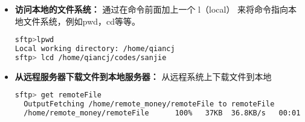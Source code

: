 \documentclass[lang=cn,a4paper,newtx]{elegantpaper}
\begin{document}
\begin{itemize}
  首先，通过找出我们当前在远程系统上的哪个目录来定位自己
  \begin{lstlisting}[language=bash]
sftp>pwd
Remote working directory: /home/sesame
  \end{lstlisting}
  查看远程系统当前目录的内容
  \begin{lstlisting}[language=bash]
sftp>ls
Cognata                                                                                    Desktop                                                                                    
Documents                                                                                  Downloads                                                                                                                                                                        
nohup.out                                                                                  opt                                                                                        
pangweisong                                                                                qiancj                                                                                     
set_iptables.sh
  \end{lstlisting}
  SFTP其实也实现了一些更重要的可选标志，例如将 -la 添加到 ls 以查看更多文件元数据和权限：
  \begin{lstlisting}[language=bash]
sftp>ls -la
  outputdrwxr-xr-x    5 remote_money   remote_money       4096 Aug 13 15:11 .
  drwxr-xr-x    3 root     root         4096 Aug 13 15:02 ..
  -rw-------    1 remote_money   remote_money          5 Aug 13 15:04 .bash_history
  -rw-r--r--    1 remote_money   remote_money        220 Aug 13 15:02 .bash_logout
  -rw-r--r--    1 remote_money   remote_money       3486 Aug 13 15:02 .bashrc
  drwx------    2 remote_money   remote_money       4096 Aug 13 15:04 .cache
  -rw-r--r--    1 remote_money   remote_money        675 Aug 13 15:02 .profile
  . . .
  \end{lstlisting}
  进入到其他目录
  \begin{lstlisting}[language=bash]
sftp>cd testDirectory
sftp> cd qiancj
  \end{lstlisting}
  \item \textbf{访问本地的文件系统：}
  通过在命令前面加上一个 l（local） 来将命令指向本地文件系统，例如pwd，cd等等。
  \begin{lstlisting}[language=bash]
sftp>lpwd
Local working directory: /home/qiancj
sftp> lcd /home/qiancj/codes/sanjie
  \end{lstlisting}
  \item \textbf{从远程服务器下载文件到本地服务器：}
  从远程系统上下载文件到本地
  \begin{lstlisting}[language=bash]
sftp> get remoteFile
  OutputFetching /home/remote_money/remoteFile to remoteFile
  /home/remote_money/remoteFile      100%   37KB  36.8KB/s   00:01
  \end{lstlisting}
  

\end{itemize}
\end{document}
